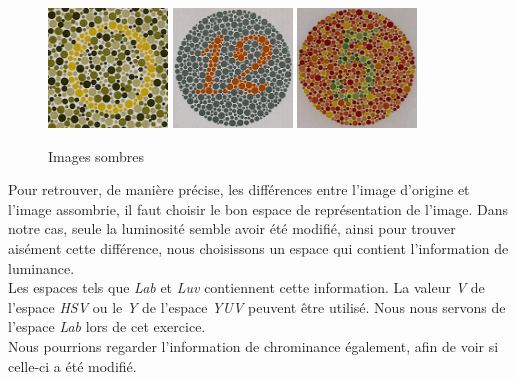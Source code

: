 \documentclass[a4paper,11pt]{article}
\begin{document}
\begin{figure}[H]
  \begin{center}
    \includegraphics[width=120px]{images/it1_72pp_sombre.png}
    \includegraphics[width=120px]{images/it2_72pp_sombre.png}
    \includegraphics[width=120px]{images/it3_72pp_sombre.png}
    \caption{Images sombres}
  \end{center}
\end{figure}

Pour retrouver, de manière précise, les différences entre l'image 
d'origine et l'image assombrie, il faut choisir le bon espace de
représentation de l'image. Dans notre cas, seule la luminosité 
semble avoir été modifié, ainsi pour trouver aisément cette 
différence, nous choisissons un espace qui contient l'information de 
luminance.\\

Les espaces tels que \textit{Lab} et \textit{Luv} contiennent cette 
information. La valeur \textit{V} de l'espace \textit{HSV} ou le 
\textit{Y} de l'espace \textit{YUV} peuvent être utilisé. Nous 
nous servons de l'espace \textit{Lab} lors de cet exercice.\\

Nous pourrions regarder l'information de chrominance également, 
afin de voir si celle-ci a été modifié.\\
\end{document}
